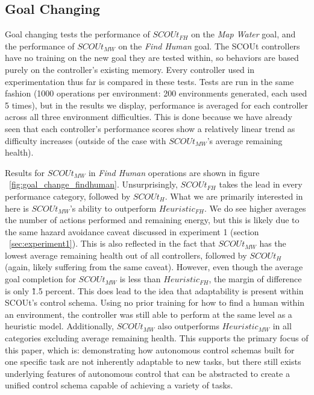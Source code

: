 \subsection{Goal Changing}
Goal changing tests the performance of $SCOUt_{FH}$ on the \textit{Map Water} goal, and the performance of $SCOUt_{MW}$ on the \textit{Find Human} goal.
The SCOUt controllers have no training on the new goal they are tested within, so behaviors are based purely on the controller's existing memory.
Every controller used in experimentation thus far is compared in these tests.
Tests are run in the same fashion (1000 operations per environment: 200 environments generated, each used 5 times), but in the results we display, performance is averaged for each controller across all three environment difficulties.
This is done because we have already seen that each controller's performance scores show a relatively linear trend as difficulty increases (outside of the case with $SCOUt_{MW}$'s average remaining health).

Results for $SCOUt_{MW}$ in \textit{Find Human} operations are shown in figure ~\ref{fig:goal_change_findhuman}.
Unsurprisingly, $SCOUt_{FH}$ takes the lead in every performance category, followed by $SCOUt_{H}$.
What we are primarily interested in here is $SCOUt_{MW}$'s ability to outperform $Heuristic_{FH}$.
We do see higher averages the number of actions performed and remaining energy, but this is likely due to the same hazard avoidance caveat discussed in experiment 1 (section ~\ref{sec:experiment1}).
This is also reflected in the fact that $SCOUt_{MW}$ has the lowest average remaining health out of all controllers, followed by $SCOUt_{H}$ (again, likely suffering from the same caveat).
However, even though the average goal completion for $SCOUt_{MW}$ is less than $Heuristic_{FH}$, the margin of difference is only \~1.5 percent.
This does lead to the idea that adaptability is present within SCOUt's control schema.
Using no prior training for how to find a human within an environment, the controller was still able to perform at the same level as a heuristic model.
Additionally, $SCOUt_{MW}$ also outperforms $Heuristic_{MW}$ in all categories excluding average remaining health.
This supports the primary focus of this paper, which is: demonstrating how autonomous control schemas built for one specific task are not inherently adaptable to new tasks, but there still exists underlying features of autonomous control that can be abstracted to create a unified control schema capable of achieving a variety of tasks.

